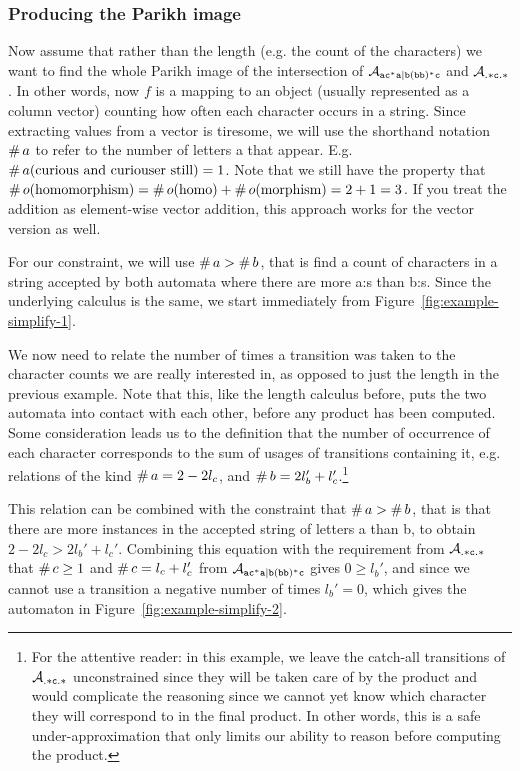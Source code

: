 \documentclass[acmsmall,review,anonymous,screen]{acmart}\settopmatter{printfolios=true,printccs=false,printacmref=true}
\theoremstyle{definition}
\begin{document}
\subsubsection{Producing the Parikh image}\label{sec:introduction:parikh}

Now assume that rather than the length (e.g. the count of the characters) we
want to find the whole Parikh image of the intersection of $\mathcal{A}_{\mathtt{ac^*a|b(bb)^*c}}{}$ and
$\mathcal{A}_{\mathtt{.*c.*}}{}$. In other words, now $f$ is a mapping to an object
(usually represented as a column vector) counting how often each character
occurs in a string. Since extracting values from a vector is tiresome, we will
use the shorthand notation $\operatorname{\#}{a}$ to refer to the number of
letters a that appear. E.g. $\operatorname{\#}{a}(\text{curious and curiouser
still}) = 1$. Note that we still have the property that
$\operatorname{\#}{o}(\text{homomorphism}) = \operatorname{\#}{o}(\text{homo}) +
\operatorname{\#}{o}(\text{morphism}) = 2 + 1 = 3$. If you treat the addition as
element-wise vector addition, this approach works for the vector version as
well.

For our constraint, we will use $\operatorname{\#}{a} > \operatorname{\#}{b}$,
that is find a count of characters in a string accepted by both automata where
there are more a:s than b:s. Since the underlying calculus is the same, we start immediately from Figure~\ref{fig:example-simplify-1}.

  We now need to relate the number of times a transition was taken to the
  character counts we are really interested in, as opposed to just the length in
  the previous example. Note that this, like the length calculus before, puts
  the two automata into contact with each other, before any product has been
  computed. Some consideration leads us to the definition that the number of
  occurrence of each character corresponds to the sum of usages of transitions
  containing it, e.g. relations of the kind $\operatorname{\#}{a} = 2 - 2l_c$,
  and $\operatorname{\#}{b} = 2 l_b' + l_c'$.\footnote{For the attentive reader:
  in this example, we leave the catch-all transitions of $\mathcal{A}_{\mathtt{.*c.*}}$
  unconstrained since they will be taken care of by the product and would
  complicate the reasoning since we cannot yet know which character they will
  correspond to in the final product. In other words, this is a safe
  under-approximation that only limits our ability to reason before computing
  the product.}

This relation can be combined with the constraint that $\operatorname{\#}{a} >
\operatorname{\#}{b}$, that is that there are more instances in the accepted
string of letters a than b, to obtain $2 - 2l_c > 2 l_b' + l_c'$. Combining this
equation with the requirement from $\mathcal{A}_{\mathtt{.*c.*}}$ that
$\operatorname{\#}{c} \geq 1$ and $\operatorname{\#}{c} = l_c + l_c'$ from
$\mathcal{A}_{\mathtt{ac^*a|b(bb)^*c}}$ gives $0 \geq l_b'$, and since we cannot use a transition a negative
number of times $l_b' = 0$, which gives the automaton in
Figure~\ref{fig:example-simplify-2}.
\end{document}
